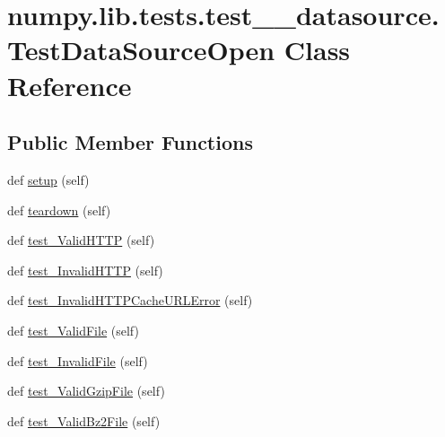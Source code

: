 \hypertarget{classnumpy_1_1lib_1_1tests_1_1test____datasource_1_1TestDataSourceOpen}{}\section{numpy.\+lib.\+tests.\+test\+\_\+\+\_\+datasource.\+Test\+Data\+Source\+Open Class Reference}
\label{classnumpy_1_1lib_1_1tests_1_1test____datasource_1_1TestDataSourceOpen}
\subsection*{Public Member Functions}
\begin{DoxyCompactItemize}
\item 
def \hyperlink{classnumpy_1_1lib_1_1tests_1_1test____datasource_1_1TestDataSourceOpen_af57c96767963290d3e5a763a932b2684}{setup} (self)
\item 
def \hyperlink{classnumpy_1_1lib_1_1tests_1_1test____datasource_1_1TestDataSourceOpen_a2c3ba56a82079ee2221862d333aa3ba0}{teardown} (self)
\item 
def \hyperlink{classnumpy_1_1lib_1_1tests_1_1test____datasource_1_1TestDataSourceOpen_adefd6e7d55131c334d160d3f529c926c}{test\+\_\+\+Valid\+H\+T\+TP} (self)
\item 
def \hyperlink{classnumpy_1_1lib_1_1tests_1_1test____datasource_1_1TestDataSourceOpen_af1751899d6aa15e573479e0a4544566b}{test\+\_\+\+Invalid\+H\+T\+TP} (self)
\item 
def \hyperlink{classnumpy_1_1lib_1_1tests_1_1test____datasource_1_1TestDataSourceOpen_a36168c394fedde49fa980741ee0c9ed7}{test\+\_\+\+Invalid\+H\+T\+T\+P\+Cache\+U\+R\+L\+Error} (self)
\item 
def \hyperlink{classnumpy_1_1lib_1_1tests_1_1test____datasource_1_1TestDataSourceOpen_a179b1225f409ff9e0ef1bf77d324892f}{test\+\_\+\+Valid\+File} (self)
\item 
def \hyperlink{classnumpy_1_1lib_1_1tests_1_1test____datasource_1_1TestDataSourceOpen_af3456cd7370d5b524fb965b51ed27834}{test\+\_\+\+Invalid\+File} (self)
\item 
def \hyperlink{classnumpy_1_1lib_1_1tests_1_1test____datasource_1_1TestDataSourceOpen_ab459c41d4224f0cb269a75069b5df161}{test\+\_\+\+Valid\+Gzip\+File} (self)
\item 
def \hyperlink{classnumpy_1_1lib_1_1tests_1_1test____datasource_1_1TestDataSourceOpen_afccf1171a44c3183a967acb24882e57d}{test\+\_\+\+Valid\+Bz2\+File} (self)
\end{DoxyCompactItemize}
